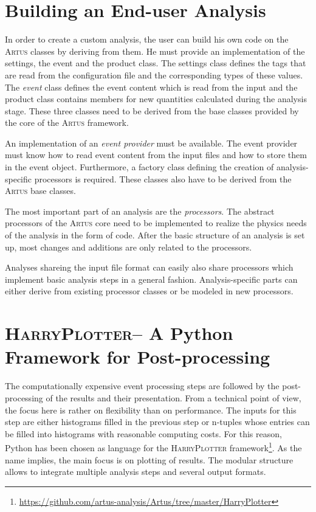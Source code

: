\documentclass[3p]{elsarticle}
\newcommand{\software}[1]{\textsc{#1}\xspace}
\newcommand{\artus}{\software{Artus}}
\newcommand{\harryplotter}{\software{HarryPlotter}}
\begin{document}
\section{Building an End-user Analysis}
\label{section_artus_analysis}
In order to create a custom analysis, the user can build his own code on the \artus classes by deriving from them.
He must provide an implementation of the settings, the event and the product class.
The settings class defines the tags that are read from the configuration file and the corresponding types of these values.
The \emph{event} class defines the event content which is read from the input and the product class contains members for new quantities calculated during the analysis stage.
These three classes need to be derived from the base classes provided by the core of the \artus framework.

An implementation of an \emph{event provider} must be available.
The event provider must know how to read event content from the input files and how to store them in the event object.
Furthermore, a factory class defining the creation of analysis-specific processors is required.
These classes also have to be derived from the \artus base classes.

The most important part of an analysis are the \emph{processors}.
The abstract processors of the \artus core need to be implemented to realize the physics needs of the analysis in the form of code.
After the basic structure of an analysis is set up, most changes and additions are only related to the processors.

Analyses shareing the input file format can easily also share processors which implement basic analysis steps in a general fashion.
Analysis-specific parts can either derive from existing processor classes or be modeled in new processors.


\section{\harryplotter -- A Python Framework for Post-processing}
\label{section_artus_harryplotter}

The computationally expensive event processing steps are followed by the post-processing of the results and their presentation.
From a technical point of view, the focus here is rather on flexibility than on performance.
The inputs for this step are either histograms filled in the previous step or n-tuples whose entries can be filled into histograms with reasonable computing costs.
For this reason, Python has been chosen as language for the \harryplotter framework\footnote{\url{https://github.com/artus-analysis/Artus/tree/master/HarryPlotter}}.
As the name implies, the main focus is on plotting of results.
The modular structure allows to integrate multiple analysis steps and several output formats.
\end{document}
